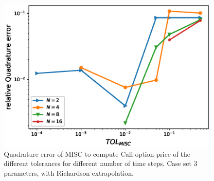 \documentclass[11pt]{article}
\begin{document}
\begin{figure}[h!]
\centering
\includegraphics[width=0.7\linewidth]{./figures/rBergomi_MISC_quadratre_error/vs_TOL/set3/relative_quad_error_wrt_MISC_TOL_set3_with_rich}


\caption{Quadrature error of MISC to compute Call option price of the different tolerances for different number of time steps. Case  set $3$ parameters, with Richardson extrapolation.}
\label{fig:Quadrature_error_set3_rich}
\end{figure}
\end{document}
